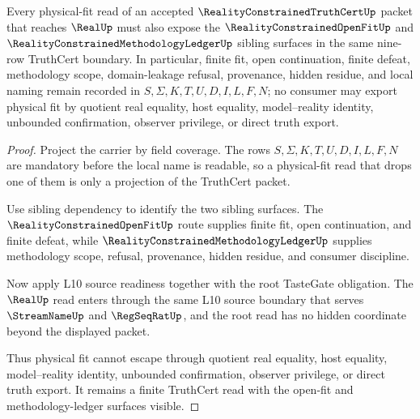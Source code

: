 \begin{theorem}
\label{thm:reality-constrained-truth-cert-physical-fit-nonescape}
Every physical-fit read of an accepted $\RealityConstrainedTruthCertUp$ packet
that reaches $\RealUp$ must also expose the $\RealityConstrainedOpenFitUp$ and
$\RealityConstrainedMethodologyLedgerUp$ sibling surfaces in the same nine-row
TruthCert boundary. In particular, finite fit, open continuation, finite
defeat, methodology scope, domain-leakage refusal, provenance, hidden residue,
and local naming remain recorded in $S,\Sigma,K,T,U,D,I,L,F,N$; no consumer may
export physical fit by quotient real equality, host equality, model--reality
identity, unbounded confirmation, observer privilege, or direct truth export.
\end{theorem}
\begin{proof}
Project the carrier by field coverage. The rows $S,\Sigma,K,T,U,D,I,L,F,N$ are
mandatory before the local name is readable, so a physical-fit read that drops
one of them is only a projection of the TruthCert packet.

Use sibling dependency to identify the two sibling surfaces. The
$\RealityConstrainedOpenFitUp$ route supplies finite fit, open continuation,
and finite defeat, while $\RealityConstrainedMethodologyLedgerUp$ supplies
methodology scope, refusal, provenance, hidden residue, and consumer
discipline.

Now apply L10 source readiness together with the root TasteGate obligation.
The $\RealUp$ read enters through the same L10 source boundary that serves
$\StreamNameUp$ and $\RegSeqRatUp$, and the root read has no hidden coordinate
beyond the displayed packet.

Thus physical fit cannot escape through quotient real equality, host equality,
model--reality identity, unbounded confirmation, observer privilege, or direct
truth export. It remains a finite TruthCert read with the open-fit and
methodology-ledger surfaces visible.
\end{proof}

